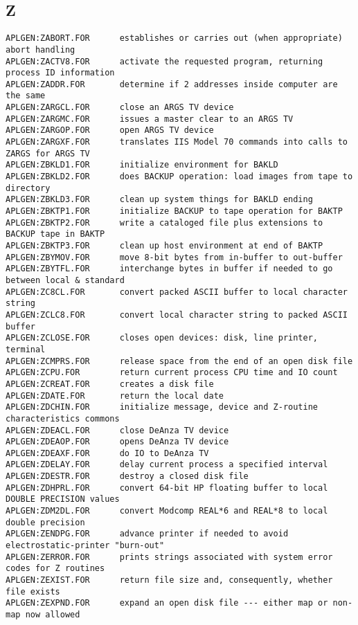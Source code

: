 \subsection{Z}
\begin{verbatim}
APLGEN:ZABORT.FOR      establishes or carries out (when appropriate) abort handling
APLGEN:ZACTV8.FOR      activate the requested program, returning process ID information
APLGEN:ZADDR.FOR       determine if 2 addresses inside computer are the same
APLGEN:ZARGCL.FOR      close an ARGS TV device
APLGEN:ZARGMC.FOR      issues a master clear to an ARGS TV
APLGEN:ZARGOP.FOR      open ARGS TV device
APLGEN:ZARGXF.FOR      translates IIS Model 70 commands into calls to ZARGS for ARGS TV
APLGEN:ZBKLD1.FOR      initialize environment for BAKLD
APLGEN:ZBKLD2.FOR      does BACKUP operation: load images from tape to directory
APLGEN:ZBKLD3.FOR      clean up system things for BAKLD ending
APLGEN:ZBKTP1.FOR      initialize BACKUP to tape operation for BAKTP
APLGEN:ZBKTP2.FOR      write a cataloged file plus extensions to BACKUP tape in BAKTP
APLGEN:ZBKTP3.FOR      clean up host environment at end of BAKTP
APLGEN:ZBYMOV.FOR      move 8-bit bytes from in-buffer to out-buffer
APLGEN:ZBYTFL.FOR      interchange bytes in buffer if needed to go between local & standard
APLGEN:ZC8CL.FOR       convert packed ASCII buffer to local character string
APLGEN:ZCLC8.FOR       convert local character string to packed ASCII buffer
APLGEN:ZCLOSE.FOR      closes open devices: disk, line printer, terminal
APLGEN:ZCMPRS.FOR      release space from the end of an open disk file
APLGEN:ZCPU.FOR        return current process CPU time and IO count
APLGEN:ZCREAT.FOR      creates a disk file
APLGEN:ZDATE.FOR       return the local date
APLGEN:ZDCHIN.FOR      initialize message, device and Z-routine characteristics commons
APLGEN:ZDEACL.FOR      close DeAnza TV device
APLGEN:ZDEAOP.FOR      opens DeAnza TV device
APLGEN:ZDEAXF.FOR      do IO to DeAnza TV
APLGEN:ZDELAY.FOR      delay current process a specified interval
APLGEN:ZDESTR.FOR      destroy a closed disk file
APLGEN:ZDHPRL.FOR      convert 64-bit HP floating buffer to local DOUBLE PRECISION values
APLGEN:ZDM2DL.FOR      convert Modcomp REAL*6 and REAL*8 to local double precision
APLGEN:ZENDPG.FOR      advance printer if needed to avoid electrostatic-printer "burn-out"
APLGEN:ZERROR.FOR      prints strings associated with system error codes for Z routines
APLGEN:ZEXIST.FOR      return file size and, consequently, whether file exists
APLGEN:ZEXPND.FOR      expand an open disk file --- either map or non-map now allowed

\end{verbatim}
